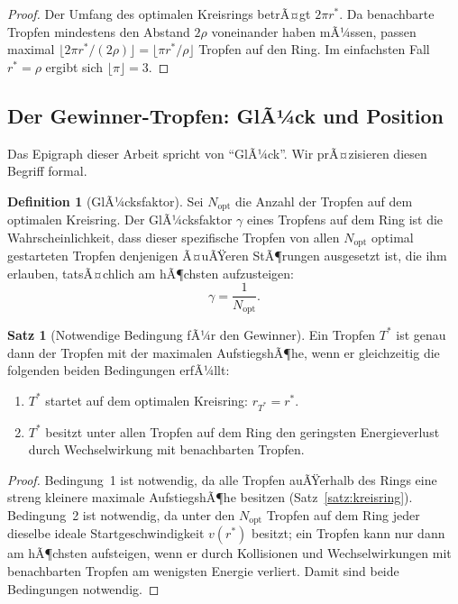 ﻿\documentclass[a4paper,12pt]{article}
\theoremstyle{definition}
\newtheorem{definition}{Definition}
\newtheorem{satz}{Satz}
\begin{document}
\begin{proof}
    Der Umfang des optimalen Kreisrings betrÃ¤gt $2\pi r^*$. Da benachbarte Tropfen
    mindestens den Abstand $2\rho$ voneinander haben mÃ¼ssen, passen maximal
    $\lfloor 2\pi r^* / (2\rho) \rfloor = \lfloor \pi r^* / \rho \rfloor$ Tropfen
    auf den Ring. Im einfachsten Fall $r^* = \rho$ ergibt sich $\lfloor \pi \rfloor = 3$. \qedhere
\end{proof}

\subsection{Der Gewinner-Tropfen: GlÃ¼ck und Position}

Das Epigraph dieser Arbeit spricht von ``GlÃ¼ck''. Wir prÃ¤zisieren diesen Begriff formal.

\begin{definition}[GlÃ¼cksfaktor]
    Sei $N_{\text{opt}}$ die Anzahl der Tropfen auf dem optimalen Kreisring.
    Der GlÃ¼cksfaktor $\gamma$ eines Tropfens auf dem Ring ist die Wahrscheinlichkeit,
    dass dieser spezifische Tropfen von allen $N_{\text{opt}}$ optimal gestarteten Tropfen
    denjenigen Ã¤uÃŸeren StÃ¶rungen ausgesetzt ist, die ihm erlauben, tatsÃ¤chlich am hÃ¶chsten
    aufzusteigen:
    \[
    \gamma = \frac{1}{N_{\text{opt}}}.
    \]
\end{definition}

\begin{satz}[Notwendige Bedingung fÃ¼r den Gewinner]
\label{satz:gewinner}
    Ein Tropfen $T^*$ ist genau dann der Tropfen mit der maximalen AufstiegshÃ¶he, wenn er
    gleichzeitig die folgenden beiden Bedingungen erfÃ¼llt:
    \begin{enumerate}
        \item $T^*$ startet auf dem optimalen Kreisring: $r_{T^*} = r^*$.
        \item $T^*$ besitzt unter allen Tropfen auf dem Ring den geringsten
              Energieverlust durch Wechselwirkung mit benachbarten Tropfen.
    \end{enumerate}
\end{satz}

\begin{proof}
    Bedingung~1 ist notwendig, da alle Tropfen auÃŸerhalb des Rings eine streng kleinere
    maximale AufstiegshÃ¶he besitzen (Satz~\ref{satz:kreisring}). Bedingung~2 ist notwendig,
    da unter den $N_{\text{opt}}$ Tropfen auf dem Ring jeder dieselbe ideale Startgeschwindigkeit
    $v(r^*)$ besitzt; ein Tropfen kann nur dann am hÃ¶chsten aufsteigen, wenn er durch
    Kollisionen und Wechselwirkungen mit benachbarten Tropfen am wenigsten Energie verliert.
    Damit sind beide Bedingungen notwendig. \qedhere
\end{proof}
\end{document}
